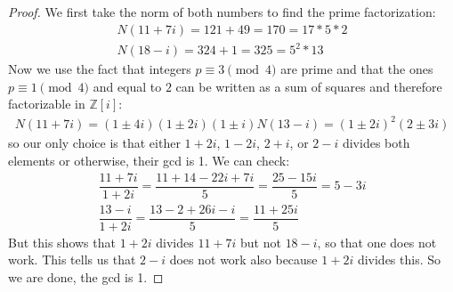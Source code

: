 \documentclass{article}
\begin{document}
\begin{enumerate}
\begin{proof}
			We first take the norm of both numbers to find the prime factorization:
			\begin{align*}
				N(11 + 7i) = 121 + 49 = 170 = 17 * 5 * 2 \\
				N(18 - i) = 324 + 1 = 325 = 5^{2} * 13 
			\end{align*}
			Now we use the fact that integers $p \equiv 3 \pmod{4}$ are prime and that the ones $p \equiv 1 \pmod{4}$ and equal to $2$ can be written as a sum of squares and therefore factorizable in $\mathbb{Z}[i]$:
			\begin{align*}
				N(11 + 7i) = (1 \pm 4i)(1 \pm 2i)(1 \pm i)
				N(13 - i) = (1 \pm 2i)^{2}(2 \pm 3i)
			\end{align*}
			so our only choice is that either $1 + 2i$, $1 - 2i$, $2 + i$, or $2 - i$ divides both elements or otherwise, their gcd is 1. We can check:
			\begin{align*}
				\dfrac{11 + 7i}{1 + 2i} = \dfrac{11 + 14 - 22i + 7i}{5} = \dfrac{25 - 15i}{5} = 5 - 3i\\
				\dfrac{13 - i}{1 + 2i} = \dfrac{13 - 2 + 26i - i}{5} = \dfrac{11 + 25i}{5}
			\end{align*}
			But this shows that $1 + 2i$ divides $11 + 7i$ but not $18 - i$, so that one does not work. This tells us that $2 - i$ does not work also because $1 + 2i$ divides this. So we are done, the gcd is 1.
		\end{proof}
\end{enumerate}
\end{document}
